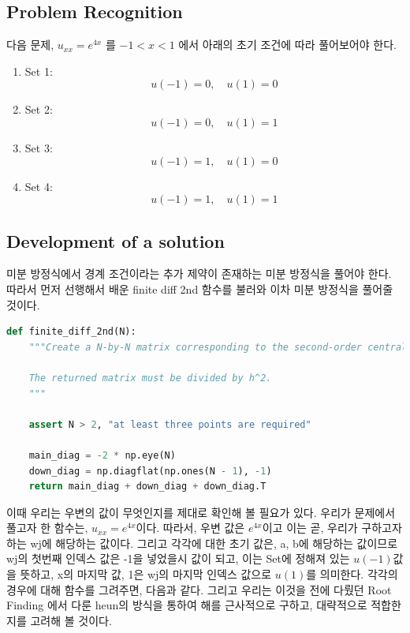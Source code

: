 \documentclass[11pt]{article}
\begin{document}
\subsection{Problem Recognition} 
다음 문제, $u_{xx} = e^{4x}$ 를 $-1 < x < 1$ 에서 아래의 초기 조건에 따라 풀어보어야 한다.
\begin{enumerate}
    \item  Set 1: 
    \begin{equation}
    u(-1) = 0,
    \quad
    u( 1) = 0
        \end{equation}
        \item  Set 2:
            \begin{equation}
            u(-1) = 0
    ,\quad
    u( 1) = 1
                    \end{equation}
            \item  Set 3:
                        \begin{equation}
                        u(-1) = 1
    ,\quad
    u( 1) = 0
                                \end{equation}
                \item  Set 4:
                            \begin{equation}
                            u(-1) = 1
    ,\quad
    u( 1) = 1
                                    \end{equation}
    
\end{enumerate}
\subsection{Development of a solution} 
미분 방정식에서 경계 조건이라는 추가 제약이 존재하는 미분 방정식을 풀어야 한다. 따라서 먼저 선행해서 배운 finite diff 2nd 함수를 불러와 이차 미분 방정식을 풀어줄 것이다. 
\begin{lstlisting}[language=Python]
def finite_diff_2nd(N):
    """Create a N-by-N matrix corresponding to the second-order central difference formula.
    
    The returned matrix must be divided by h^2.
    """
    
    assert N > 2, "at least three points are required"
    
    main_diag = -2 * np.eye(N)
    down_diag = np.diagflat(np.ones(N - 1), -1)
    return main_diag + down_diag + down_diag.T
    \end{lstlisting}
이때 우리는 우변의 값이 무엇인지를 제대로 확인해 볼 필요가 있다. 우리가 문제에서 풀고자 한 함수는, $u_{xx} = e^{4x}$이다. 따라서, 우변 값은 $e^{4x}$이고 이는 곧, 우리가 구하고자 하는 wj에 해당하는 값이다. 그리고 각각에 대한 초기 값은, a, b에 해당하는 값이므로 wj의 첫번째 인덱스 값은 -1을 넣었을시 값이 되고, 이는 Set에 정해져 있는 $u(-1)$값을 뜻하고, x의 마지막 값, 1은 wj의 마지막 인덱스 값으로 $u(1)$를 의미한다. 각각의 경우에 대해 함수를 그려주면, 다음과 같다. 그리고 우리는 이것을 전에 다뤘던 Root Finding 에서 다룬 heun의 방식을 통하여 해를 근사적으로 구하고, 대략적으로 적합한지를 고려해 볼 것이다.
\end{document}
